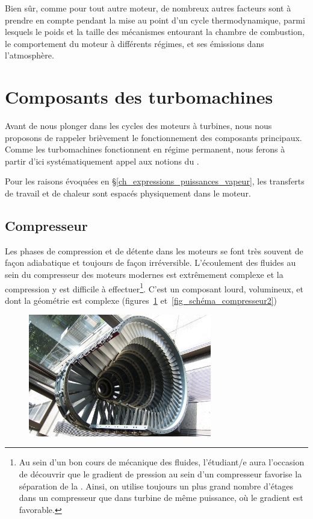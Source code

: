 		Bien sûr, comme pour tout autre moteur, de nombreux autres facteurs sont à prendre en compte pendant la mise au point d’un cycle thermodynamique, parmi lesquels le poids et la taille des mécanismes entourant la chambre de combustion, le comportement du moteur à différents régimes, et ses émissions dans l’atmosphère.


 

\section{Composants des turbomachines}

	Avant de nous plonger dans les cycles des moteurs à turbines, nous nous proposons de rappeler brièvement le fonctionnement des composants principaux. Comme les turbomachines fonctionnent en régime permanent, nous ferons à partir d’ici systématiquement appel aux notions du \courstrois.

	Pour les raisons évoquées en \S\ref{ch_expressions_puissances_vapeur}, les transferts de travail et de chaleur sont espacés physiquement dans le moteur.



	\subsection{Compresseur}

		Les phases de compression et de détente dans les moteurs se font très souvent de façon adiabatique et toujours de façon irréversible. L’écoulement des fluides au sein du compresseur des moteurs modernes est extrêmement complexe et la compression y est difficile à effectuer\footnote{Au sein d’un bon cours de mécanique des fluides, l’étudiant/e aura l’occasion de découvrir que le gradient de pression au sein d’un compresseur favorise la séparation de la . Ainsi, on utilise toujours un plus grand nombre d’étages dans un compresseur que dans turbine de même puissance, où le gradient est favorable.}\nolinebreak.
		C’est un composant lourd, volumineux, et dont la géométrie est complexe (figures~\ref{fig_schéma_compresseur1} et~\ref{fig_schéma_compresseur2})

		\begin{figure}
			\begin{center}
				\includegraphics[width=8cm]{images/photo_compresseur.jpg}
			\end{center}
			\label{fig_schéma_compresseur1}
		\end{figure}

